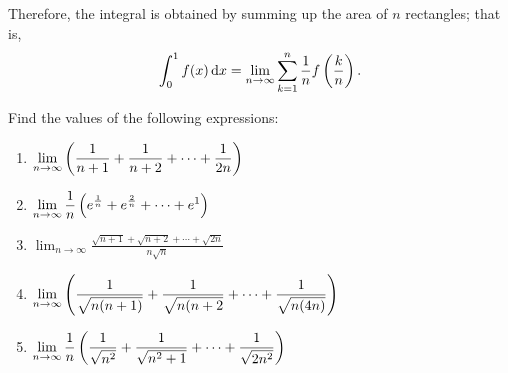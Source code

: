 Therefore, the integral is obtained by summing up the area of $n$ rectangles; that is,
\begin{equation} 
\int_{0}^{1} f(x) \dd{x} = \lim_{n \to \infty} \sum_{k=1}^{n} \frac{1}{n} f\left(\frac{k}{n}\right).
\end{equation}

\begin{exercise}
Find the values of the following expressions:
\begin{enumerate}[label=(\alph*)]
\item $\displaystyle\lim_{n\to\infty}\left(\frac{1}{n+1}+\frac{1}{n+2}+\cdots+\frac{1}{2n}\right)$
\item $\displaystyle\lim_{n\to\infty}\frac{1}{n}\left(e^\frac{1}{n}+e^\frac{2}{n}+\cdots+e^1\right)$
\item $\displaystyle\lim_{n\to\infty}\frac{\sqrt{n+1}+\sqrt{n+2}+\cdots+\sqrt{2n}}{n\sqrt{n}}$
\item $\displaystyle\lim_{n\to\infty}\left(\frac{1}{\sqrt{n(n+1)}}+\frac{1}{\sqrt{n(n+2}}+\cdots+\frac{1}{\sqrt{n(4n)}}\right)$
\item $\displaystyle\lim_{n\to\infty}\frac{1}{n}\left(\frac{1}{\sqrt{n^2}}+\frac{1}{\sqrt{n^2+1}}+\cdots+\frac{1}{\sqrt{2n^2}}\right)$
\end{enumerate}
\end{exercise}

